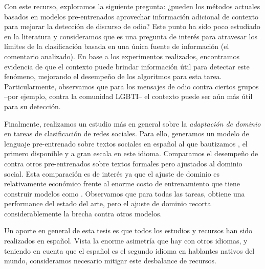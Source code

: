 Con este recurso, exploramos la siguiente pregunta: ¿pueden los métodos actuales basados en modelos pre-entrenados aprovechar información adicional de contexto para mejorar la detección de discurso de odio? Este punto ha sido poco estudiado en la literatura y consideramos que es una pregunta de interés para atravesar los límites de la clasificación basada en una única fuente de información (el comentario analizado). En base a los experimentos realizados, encontramos evidencia de que el contexto puede brindar información útil para detectar este fenómeno, mejorando el desempeño de los algoritmos para esta tarea. Particularmente, observamos que para los mensajes de odio contra ciertos grupos --por ejemplo, contra la comunidad LGBTI-- el contexto puede ser aún más útil para su detección.

Finalmente, realizamos un estudio más en general sobre la \emph{adaptación de dominio} en tareas de clasificación de redes sociales. Para ello, generamos un modelo de lenguaje pre-entrenado sobre textos sociales en español al que bautizamos \robertuito{}, el primero disponible y a gran escala en este idioma. Comparamos el desempeño de \robertuito{} contra otros pre-entrenados sobre textos formales pero ajustados al dominio social. Esta comparación es de interés ya que el ajuste de dominio es relativamente económico frente al enorme costo de entrenamiento que tiene construir modelos como \robertuito{}. Observamos que para todas las tareas, \robertuito{} obtiene una performance del estado del arte, pero el ajuste de dominio recorta considerablemente la brecha contra otros modelos.

Un aporte en general de esta tesis es que todos los estudios y recursos han sido realizados en español. Vista la enorme asimetría que hay con otros idiomas, y teniendo en cuenta que el español es el segundo idioma en hablantes nativos del mundo, consideramos necesario mitigar este desbalance de recursos.
